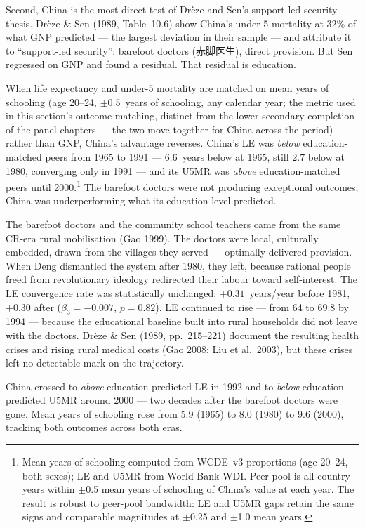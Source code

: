 \documentclass[12pt,letterpaper]{article}
\begin{document}
Second, China is the most direct test of Drèze and Sen's
support-led-security thesis. Drèze \& Sen (1989, Table~10.6) show
China's under-5 mortality at 32\% of what GNP predicted --- the largest
deviation in their sample --- and attribute it to ``support-led
security'': barefoot doctors (赤脚医生), direct provision. But Sen
regressed on GNP and found a residual. That residual is education.

When life expectancy and under-5 mortality are matched on mean years of
schooling (age 20--24, $\pm$0.5~years of schooling, any calendar year;
the metric used in this section's outcome-matching, distinct from the
lower-secondary completion of the panel chapters --- the two move
together for China across the period) rather than GNP, China's
advantage reverses. China's LE was
\emph{below} education-matched peers from 1965 to 1991 --- 6.6~years
below at 1965, still 2.7 below at 1980, converging only in 1991 --- and
its U5MR was \emph{above} education-matched peers until 2000.\footnote{Mean years of schooling
computed from WCDE~v3 proportions (age 20--24, both sexes); LE and U5MR
from World Bank WDI. Peer pool is all country-years within $\pm$0.5
mean years of schooling of China's value at each year. The result is robust to peer-pool bandwidth: LE and U5MR gaps retain the same signs and comparable magnitudes at $\pm$0.25 and $\pm$1.0 mean years.} The barefoot
doctors were not producing exceptional outcomes; China was
underperforming what its education level predicted.

The barefoot doctors and the community school teachers came from the same
CR-era rural mobilisation (Gao 1999). The doctors were local, culturally embedded,
drawn from the villages they served --- optimally delivered provision.
When Deng dismantled the system after 1980, they left, because rational
people freed from revolutionary ideology redirected their labour toward
self-interest. The LE convergence rate was statistically unchanged:
$+0.31$~years/year before 1981, $+0.30$ after ($\beta_3 = -0.007$, $p =
0.82$). LE continued to rise --- from 64 to 69.8 by 1994 --- because
the educational baseline built into rural households did not leave with
the doctors. Drèze \& Sen (1989, pp.~215--221) document the resulting
health crises and rising rural medical costs (Gao 2008; Liu et
al.~2003), but these crises left no detectable mark on the trajectory.

China crossed to \emph{above} education-predicted LE in 1992 and to
\emph{below} education-predicted U5MR around 2000 --- two decades after
the barefoot doctors were gone. Mean years of schooling rose from 5.9
(1965) to 8.0 (1980) to 9.6 (2000), tracking both outcomes across both
eras.
\end{document}
